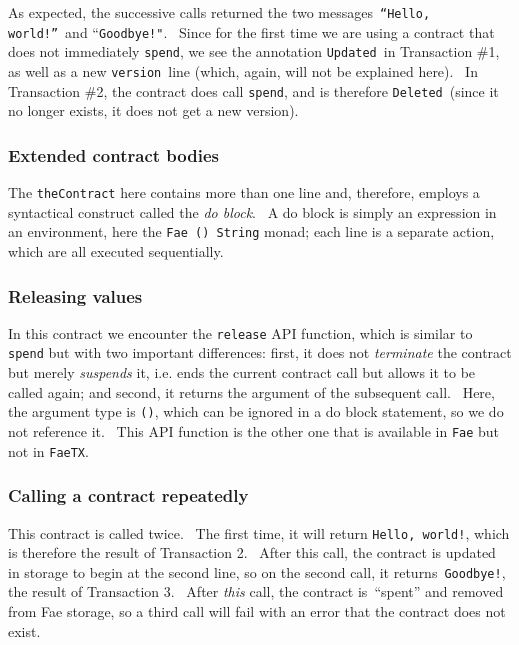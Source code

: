 \documentclass[11pt]{article}
\begin{document}
As expected, the successive calls returned the two messages \texttt{“Hello, world!”} and “\texttt{Goodbye!"}.  Since for the first time we are using a contract that does not immediately \texttt{spend}, we see the annotation \texttt{Updated} in Transaction \#1, as well as a new \texttt{version} line (which, again, will not be explained here).  In Transaction \#2, the contract does call \texttt{spend}, and is therefore \texttt{Deleted} (since it no longer exists, it does not get a new version).

\subsubsection{Extended contract bodies}
\vspace{5.5pt}

The \texttt{theContract} here contains more than one line and, therefore, employs a syntactical construct called the \textit{do block}.  A do block is simply an expression in an environment, here the \texttt{Fae () String} monad; each line is a separate action, which are all executed sequentially.

\subsubsection{Releasing values}
\vspace{5.5pt}

In this contract we encounter the \texttt{release} API function, which is similar to \texttt{spend} but with two important differences: first, it does not \textit{terminate} the contract but merely \textit{suspends} it, i.e. ends the current contract call but allows it to be called again; and second, it returns the argument of the subsequent call.  Here, the argument type is \texttt{()}, which can be ignored in a do block statement, so we do not reference it.  This API function is the other one that is available in \texttt{Fae} but not in \texttt{FaeTX}.

\subsubsection{Calling a contract repeatedly}
\vspace{5.5pt}

This contract is called twice.  The first time, it will return \texttt{Hello, world!}, which is therefore the result of Transaction 2.  After this call, the contract is updated in storage to begin at the second line, so on the second call, it returns \texttt{Goodbye!}, the result of Transaction 3.  After \textit{this} call, the contract is “spent” and removed from Fae storage, so a third call will fail with an error that the contract does not exist.
\end{document}
